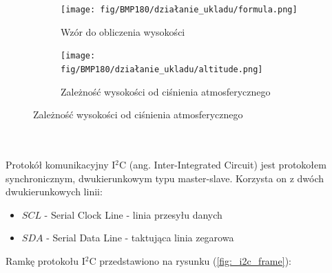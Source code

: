 \documentclass[11pt, a4paper]{article}
\begin{document}
\vspace{0.25cm}
\begin{figure}[h]
\centering
\begin{subfigure}{.5\textwidth}
\centering
\texttt{[image: fig/BMP180/działanie\_ukladu/formula.png]}
\caption{Wzór do obliczenia wysokości \cite{Bosch:BMP180}}
\label{fig:_bmp180_formula}
\end{subfigure}%
\begin{subfigure}{.5\textwidth}
\centering
\texttt{[image: fig/BMP180/działanie\_ukladu/altitude.png]}
\caption{Zależność wysokości od ciśnienia atmosferycznego \cite{Bosch:BMP180}}
\label{fig:_altitude}
\end{subfigure}
\label{fig:element}
\end{figure}
\vspace{0.25cm}


\\ \\
Protokół komunikacyjny I$^2$C (ang. Inter-Integrated Circuit) jest protokołem synchronicznym, dwukierunkowym typu master-slave. Korzysta on z dwóch dwukierunkowych linii:
\begin{itemize}
  \item $SCL$ - Serial Clock Line - linia przesyłu danych
  \item $SDA$ - Serial Data Line - taktująca linia zegarowa
\end{itemize}
Ramkę protokołu I$^2$C przedstawiono na rysunku (\ref{fig:_i2c_frame}):
\end{document}
